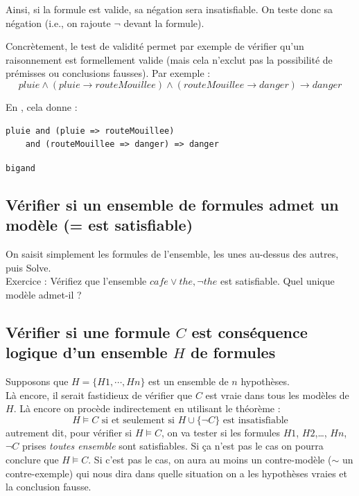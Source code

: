\noindent
Ainsi, si la formule est valide, sa négation sera insatisfiable. On teste donc sa négation (i.e., on rajoute $\neg$ devant la formule).

Concrètement, le test de validité permet par exemple de vérifier qu'un raisonnement est formellement valide (mais cela n'exclut pas la possibilité de prémisses ou conclusions fausses). Par exemple :
\[pluie \wedge (pluie \rightarrow routeMouillee) \wedge (routeMouillee \rightarrow danger) \rightarrow danger\]

En \touist, cela donne :

\begin{lstlisting}[language=touist, frame=single]
pluie and (pluie => routeMouillee)
    and (routeMouillee => danger) => danger
\end{lstlisting}

\lstinline[columns=fixed,language=touist]{bigand}






\subsection{Vérifier si un ensemble de formules admet un modèle (= est satisfiable)}
On saisit simplement les formules de l'ensemble, les unes au-dessus des autres, puis Solve. \\
Exercice : Vérifiez que l'ensemble $\mathit{cafe\vee the, \neg the}$ est satisfiable. Quel unique modèle admet-il ? 
\subsection{Vérifier si une formule $C$ est conséquence logique d'un ensemble $H$ de formules}
Supposons que $H=\{H1,\cdots,Hn\}$ est un ensemble de $n$ hypothèses.\\
Là encore, il serait fastidieux de vérifier que $C$ est vraie dans tous les modèles de $H$. Là encore on procède indirectement en utilisant le théorème : 
\[H\models C \mbox{ si et seulement si } H\cup\{\neg C\}\mbox{ est insatisfiable}\]
autrement dit, pour vérifier si $H\models C$, on va tester si les formules $H1$, $H2$,\ldots, $Hn$, $\neg C$ prises \emph{toutes ensemble} sont satisfiables. Si ça n'est pas le cas on pourra conclure que $H\models C$. Si c'est pas le cas, on aura au moins un contre-modèle ($\sim$ un contre-exemple) qui nous dira dans quelle situation on a les hypothèses vraies et la conclusion fausse.

